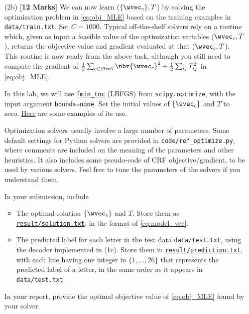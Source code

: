 \documentclass[11pt]{report}
\begin{document}
\begin{itemize}
	{\bf Provide} the value of $\frac{1}{n} \sum_{t=1}^n \log p(\yvec^t | X^t)$ for this case in your report.
	Hint: it is in $[-100,0]$.

	
	For your reference,
	in your instructor's Python implementation,
	it takes 5 seconds to compute the gradient on the whole training set.
	Single core of Intel(R) i7-10510U CPU @ 1.80GHz.

	\textcolor{b}{See code/q2 gradient.py for implementation and result/gradient.txt for results. Average log p(y—X) over training set is -31.288437439649137}
		
	
	\item[(2b)] {\bf [12 Marks]} We can now learn ($\{\wvec_c\}, T$) by solving the optimization problem in \eqref{eq:obj_MLE} based on the training examples in \verb#data/train.txt#.
	Set $C = 1000$.
	Typical off-the-shelf solvers rely on a routine which, given as input a feasible value of the optimization variables ($\wvec_c, T$), returns the objective value and gradient evaluated at that ($\wvec_c, T$). This routine is now ready from the above task,
	although you still need to compute the gradient of $\frac{1}{2} \sum_{c \in \Ycal} \nbr{\wvec_c}^2 + \frac{1}{2} \sum_{ij} T^2_{ij}$ in \eqref{eq:obj_MLE}.
	
	In this lab, we will use \href{https://docs.scipy.org/doc/scipy/reference/generated/scipy.optimize.fmin_tnc.html}{\texttt{fmin\_tnc}} (LBFGS) from \verb#scipy.optimize#, with the input argument \verb#bounds=none#.	
	Set the initial values of $\{\wvec_c\}$ and $T$ to zero.
	\href{https://www.programcreek.com/python/example/114546/scipy.optimize.fmin_tnc}{Here} are some examples of its use.
		
	Optimization solvers usually involve a large number of parameters.
	Some default settings for Python solvers are provided in \verb#code/ref_optimize.py#,
	where comments are included on the meaning of the parameters and other heuristics.
	It also includes some pseudo-code of CRF objective/gradient,
	to be used by various solvers.
	Feel free to tune the parameters of the solvers if you understand them.
	
	In your submission, include
	\begin{itemize}
		\item The optimal solution $\{\wvec_c\}$ and $T$.  Store them as \underline{\tt{result/solution.txt}}, in the format of \eqref{eq:model_vec}.
		\item The predicted label for each letter in the test data \verb#data/test.txt#, using the decoder implemented in (1c).
		Store them in \underline{\tt{result/prediction.txt}},
		with each line having one integer in $\{1,\ldots, 26\}$ that represents the predicted label of a letter, in the same order as it appears in \verb#data/test.txt#.
	\end{itemize}
	In your report, provide the optimal objective value of \eqref{eq:obj_MLE} found by your solver.
\end{itemize}
\end{document}
